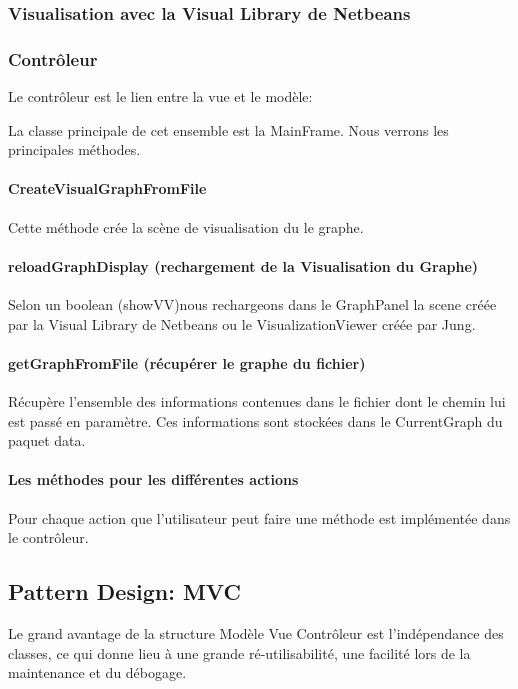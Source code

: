 \documentclass[french]{article}
\begin{document}

  \subsubsection*{Visualisation avec la Visual Library de Netbeans}
	

  \subsubsection{Contrôleur}

    Le contrôleur est le lien entre la vue et le modèle:

    La classe principale de cet ensemble est la MainFrame. Nous verrons
    les principales méthodes.
\paragraph{CreateVisualGraphFromFile}
Cette méthode crée la scène de visualisation du le graphe.

    \paragraph{reloadGraphDisplay (rechargement de la Visualisation du Graphe)}
    Selon un boolean (showVV)nous rechargeons dans le GraphPanel la scene créée par la Visual Library de Netbeans ou le VisualizationViewer créée par Jung.

    \paragraph{getGraphFromFile (récupérer le graphe du fichier)}
	Récupère l'ensemble des informations contenues dans le fichier dont le chemin lui est passé en paramètre. Ces informations sont stockées dans le CurrentGraph du paquet data.
	\paragraph{Les méthodes pour les différentes actions} 
	Pour chaque action que l'utilisateur peut faire une méthode est implémentée dans le contrôleur.


  \subsection{Pattern Design: MVC}

    Le grand avantage de la structure Modèle Vue Contrôleur est l'indépendance
    des classes, ce qui donne lieu à une grande ré-utilisabilité, une
    facilité lors de la maintenance et du débogage.
\end{document}
